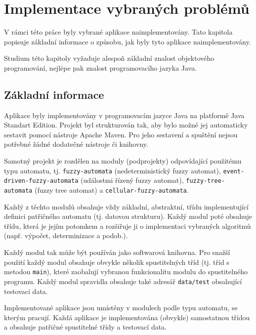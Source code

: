 \documentclass[a4paper,10pt]{article}
\begin{document}
\section{Implementace vybraných problémů}
V rámci této práce byly vybrané aplikace naimplementovány. Tato kapitola popisuje základní informace o způsobu, jak byly tyto aplikace naimplementovány.

Studium této kapitoly vyžaduje alespoň základní znalost objektového programování, nejlépe pak znalost programovacího jazyka Java.

\subsection{Základní informace}
Aplikace byly implementovány v programovacím jazyce Java na platformě Java Standart Edition. Projekt byl strukturován tak, aby bylo možné jej automaticky sestavit pomocí nástroje Apache Maven. Pro jeho sestavení a spuštění nejsou potřebné žádné dodatečné nástroje či knihovny.

Samotný projekt je rozdělen na moduly (podprojekty) odpovídající použitému typu automatu, tj. \verb|fuzzy-automata| (nedeterministický fuzzy automat), \verb|event-driven-fuzzy-automata| (událostmi řízený fuzzy automat), \verb|fuzzy-tree-automata| (fuzzy tree automat) a \verb|cellular-fuzzy-automata|.

Každý z těchto modulů obsahuje vždy základní, abstraktní, třídu implementující definici patřičného automatu (tj. datovou strukturu). Každý modul poté obsahuje třídu, která je jejím potomkem a rozšiřuje ji o implementaci vybraných algoritmů (např. výpočet, determinizace a podob.).

Každý modul tak může být používán jako softwarová knihovna. Pro snažší použití každý modul obsahuje obvykle několik spustitelných tříd (tj. tříd s metodou \verb|main|), které zaobalují vybranou funkcionalitu modulu do spustitelného programu. Každý modul spravidla obsahuje také adresář \verb|data/test| obsahující testovací data.

Implementované aplikace jsou umístěny v modulech podle typu automatu, se kterým pracují. Každá aplikace je implementována (obvykle) samostatnou třídou a obsahuje patřičné spustitelné třídy a testovací data.
\end{document}
